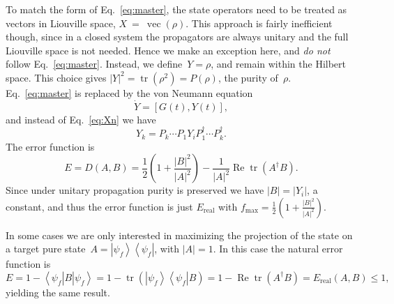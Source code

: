 \documentclass[aps, pra, a4paper, longbibliography, superscriptaddress]{revtex4-1}
\newcommand{\be}{\begin{equation}}
\newcommand{\ee}{\end{equation}}
\newcommand{\ket}[1]{\left| #1 \right \rangle}
\newcommand{\bra}[1]{\left \langle #1 \right|}
\newcommand{\braket}[2]{\left \langle #1 | #2 \right \rangle}
\newcommand{\ketbra}[2]{\left| #1 \right \rangle \left \langle #2 \right|}
\newcommand{\comm}[2]{\left[ #1, #2 \right]}
\DeclareMathOperator{\tr}{tr}
\DeclareMathOperator{\re}{Re}
\DeclareMathOperator{\cvec}{vec}
\begin{document}
To match the form of Eq.~\eqref{eq:master},
the state operators need to be treated as vectors in Liouville space,
$X~=~\cvec(\rho)$.
This approach is fairly inefficient though, since in a closed system the
propagators are always unitary and the full Liouville space is not
needed. Hence we make an exception here, and \emph{do not} follow Eq.~\eqref{eq:master}.
Instead, we define~$Y = \rho$, and remain within the Hilbert space.
This choice gives $|Y|^2 = \tr(\rho^2) = P(\rho)$, the purity of~$\rho$.
Eq.~\eqref{eq:master} is replaced by the von Neumann equation
\be
\dot{Y} = \comm{G(t)}{Y(t)},
\ee
and instead of Eq.~\eqref{eq:Xn} we have
\be
Y_k = P_k \cdots P_1 Y_i P_1^\dagger \cdots P_k^\dagger.
\ee
The error function is
\be
E
= D(A, B)
= \frac{1}{2}\left(1 +\frac{|B|^2}{|A|^2}\right) -\frac{1}{|A|^2} \re \tr(A^\dagger B).
\ee
Since under unitary propagation purity is preserved we have
$|B| = |Y_i|$, a constant, and thus the error function is just $E_\text{real}$ with
$f_{\text{max}} = \frac{1}{2}\left(1 +\frac{|B|^2}{|A|^2}\right)$.

\begin{comment}
The goal here is to minimize state operator distance
$D(A, B) = D(\rho_f, \rho_n)$.
$|X|^2$~is equivalent to the purity of the state:
\be
|X|^2
= |\cvec(\rho)|^2
= |\rho|^2
= \tr(\rho^2)
= P(\rho).
\ee
Unitary propagation conserves purity, hence (X1) holds, and we can
simply maximize the fidelity
\be
f(A, B)
= \frac{1}{P(\rho_f)} (\re) (\tr) \left( A^\dagger  P_n \cdots P_1 X_i \right).
\ee
Furthermore, the fidelity is strictly nonnegative since the
state operators are positive:
\be
0 \le f(A, B) \le \sqrt{\frac{P(\rho_i)}{P(\rho_f)}}.
\ee
If either $\rho_f$ or $\rho_i$ is pure,
$\rho = \ketbra{\psi}{\psi}$,
we have $|\rho|^2 = \braket{\psi}{\psi}^2 = 1$, and
the diagram simplifies by splitting up.
\end{comment}

In some cases we are only interested in maximizing the projection of
the state on a target pure state~$A = \ketbra{\psi_f}{\psi_f}$,
with $|A| = 1$. In this case the natural error function is
\be
E
= 1 -\bra{\psi_f} B \ket{\psi_f}
= 1 -\tr\left(\ketbra{\psi_f}{\psi_f} B \right)
= 1 -\re \tr\left(A^\dagger B\right)
= E_\text{real}(A, B) \le 1,
\ee
yielding the same result.
\end{document}
